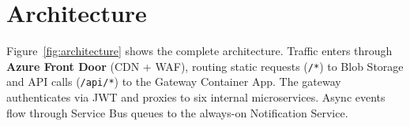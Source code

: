 \documentclass[12pt,a4paper]{article}
\begin{document}
\section{Architecture}

Figure~\ref{fig:architecture} shows the complete architecture. Traffic enters through \textbf{Azure Front Door} (CDN + WAF), routing static requests (\texttt{/*}) to Blob Storage and API calls (\texttt{/api/*}) to the Gateway Container App. The gateway authenticates via JWT and proxies to six internal microservices. Async events flow through Service Bus queues to the always-on Notification Service.
\end{document}
